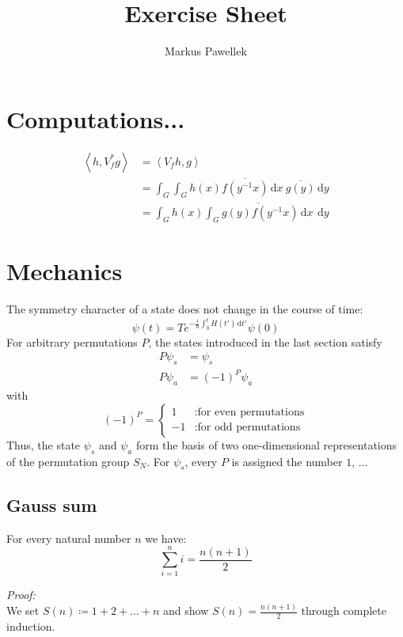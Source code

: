 \documentclass[fleqn,a4paper]{article}
\title{Exercise Sheet}
\author{Markus Pawellek}
\newcommand{\dotProduct}[2]{\left\langle #1, #2 \right\rangle}
\newcommand{\diff}[1]{\mathrm{d}#1}
\newcommand{\integral}[4]{\int_{#1}^{#2} #3 \, \diff{#4}}
\begin{document}
  \section{Computations...}
    \begin{align*}
      \dotProduct{h}{V_f^* g}
      &= \dotProduct{V_f h}{g} \\
      &= \integral{G}{}{ \integral{G}{}{h(x) \overline{f(y^{-1}x)}}{x}\ \overline{g(y)} }{y} \\
      &= \integral{G}{}{ h(x) \overline{\integral{G}{}{g(y)f(y^{-1}x)}{x}}\ }{y}
    \end{align*}

  \section{Mechanics}
    The symmetry character of a state does not change in the course of time:
    \[
      \psi(t) = T e^{-\frac{i}{\hbar}\integral{0}{t}{H(t')}{t'}} \psi(0)
    \]
    For arbitrary permutations $P$, the states introduced in the last section satisfy
    \begin{align*}
      P\psi_s &= \psi_s \\
      P\psi_a &= (-1)^P \psi_a
    \end{align*}
    with
    \[
      (-1)^P =
      \begin{cases}
        1 &: \text{for even permutations} \\
        -1 &: \text{for odd permutations}
      \end{cases}
    \]
    Thus, the state $\psi_s$ and $\psi_a$ form the basis of two one-dimensional representations of the permutation group $S_N$.
    For $\psi_s$, every $P$ is assigned the number $1$, ...

  \subsection{Gauss sum}
  \label{sub:gauss}
    For every natural number $n$ we have:
    \[
      \sum_{i=1}^n i = \frac{n(n+1)}{2}
    \]

    \textit{Proof:}\\
    We set $S(n)\coloneqq 1 + 2 + \ldots + n$ and show $S(n)=\frac{n(n+1)}{2}$ through complete induction.
\end{document}
